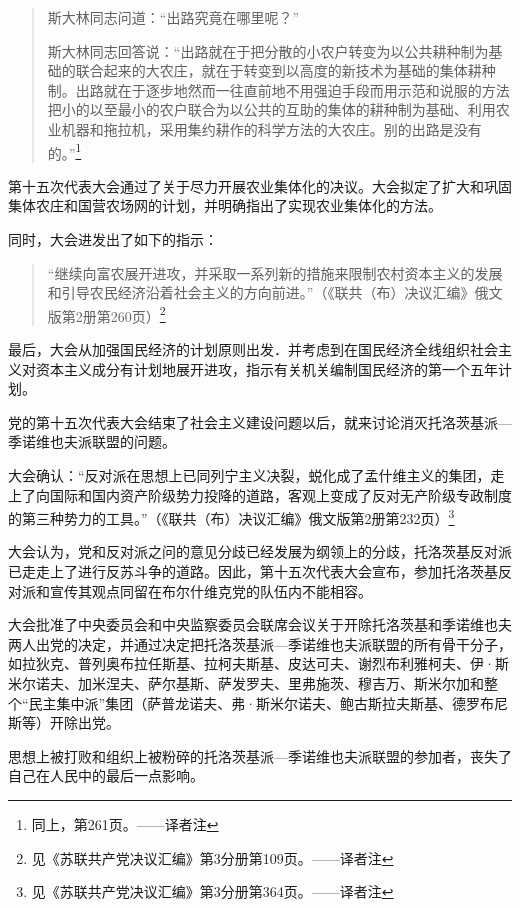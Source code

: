 \begin{quotation}
斯大林同志问道：“出路究竟在哪里呢？”

斯大林同志回答说：“出路就在于把分散的小农户转变为以公共耕种制为基础的联合起来的大农庄，就在于转变到以高度的新技术为基础的集体耕种制。出路就在于逐步地然而一往直前地不用强迫手段而用示范和说服的方法把小的以至最小的农户联合为以公共的互助的集体的耕种制为基础、利用农业机器和拖拉机，采用集约耕作的科学方法的大农庄。别的出路是没有的。”\footnote{同上，第261页。——译者注}
\end{quotation}

第十五次代表大会通过了关于尽力开展农业集体化的决议。大会拟定了扩大和巩固集体农庄和国营农场网的计划，并明确指出了实现农业集体化的方法。

同时，大会进发出了如下的指示：

\begin{quotation}
“继续向富农展开进攻，并采取一系列新的措施来限制农村资本主义的发展和引导农民经济沿着社会主义的方向前进。”（《联共（布）决议汇编》俄文版第2册第260页）\footnote{见《苏联共产党决议汇编》第3分册第109页。——译者注}
\end{quotation}

最后，大会从加强国民经济的计划原则出发．并考虑到在国民经济全线组织社会主义对资本主义成分有计划地展开进攻，指示有关机关编制国民经济的第一个五年计划。

党的第十五次代表大会结束了社会主义建设问题以后，就来讨论消灭托洛茨基派—季诺维也夫派联盟的问题。

大会确认：“反对派在思想上已同列宁主义决裂，蜕化成了孟什维主义的集团，走上了向国际和国内资产阶级势力投降的道路，客观上变成了反对无产阶级专政制度的第三种势力的工具。”（《联共（布）决议汇编》俄文版第2册第232页）\footnote{见《苏联共产党决议汇编》第3分册第364页。——译者注}

大会认为，党和反对派之问的意见分歧已经发展为纲领上的分歧，托洛茨基反对派已走走上了进行反苏斗争的道路。因此，第十五次代表大会宣布，参加托洛茨基反对派和宣传其观点同留在布尔什维克党的队伍内不能相容。

大会批准了中央委员会和中央监察委员会联席会议关于开除托洛茨基和季诺维也夫两人出党的决定，并通过决定把托洛茨基派—季诺维也夫派联盟的所有骨干分子，如拉狄克、普列奥布拉任斯基、拉柯夫斯基、皮达可夫、谢烈布利雅柯夫、伊·斯米尔诺夫、加米涅夫、萨尔基斯、萨发罗夫、里弗施茨、穆吉万、斯米尔加和整个“民主集中派”集团（萨普龙诺夫、弗·斯米尔诺夫、鲍古斯拉夫斯基、德罗布尼斯等）开除出党。

思想上被打败和组织上被粉碎的托洛茨基派—季诺维也夫派联盟的参加者，丧失了自己在人民中的最后一点影响。

